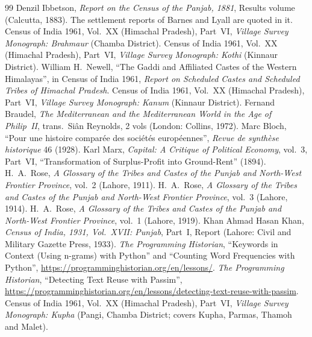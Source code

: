 \begin{thebibliography}{99}\small
{} Denzil Ibbetson, \emph{Report on the Census of the Panjab, 1881}, Results volume (Calcutta, 1883). The settlement reports of Barnes and Lyall are quoted in it.
 Census of India 1961, Vol.~XX (Himachal Pradesh), Part~VI, \emph{Village Survey Monograph: Brahmaur} (Chamba District).
 Census of India 1961, Vol.~XX (Himachal Pradesh), Part~VI, \emph{Village Survey Monograph: Kothi} (Kinnaur District).
 William H.~Newell, \enquote{The Gaddi and Affiliated Castes of the Western Himalayas}, in Census of India 1961, \emph{Report on Scheduled Castes and Scheduled Tribes of Himachal Pradesh}.
 Census of India 1961, Vol.~XX (Himachal Pradesh), Part~VI, \emph{Village Survey Monograph: Kanum} (Kinnaur District).
 Fernand Braudel, \emph{The Mediterranean and the Mediterranean World in the Age of Philip~II}, trans.\ Si\^an Reynolds, 2 vols (London: Collins, 1972).
 Marc Bloch, \enquote{Pour une histoire compar\'ee des soci\'et\'es europ\'eennes}, \emph{Revue de synth\`ese historique} 46 (1928).
 Karl Marx, \emph{Capital: A Critique of Political Economy}, vol.~3, Part~VI, \enquote{Transformation of Surplus-Profit into Ground-Rent} (1894).
 H.~A.~Rose, \emph{A Glossary of the Tribes and Castes of the Punjab and North-West Frontier Province}, vol.~2 (Lahore, 1911).
 H.~A.~Rose, \emph{A Glossary of the Tribes and Castes of the Punjab and North-West Frontier Province}, vol.~3 (Lahore, 1914).
 H.~A.~Rose, \emph{A Glossary of the Tribes and Castes of the Punjab and North-West Frontier Province}, vol.~1 (Lahore, 1919).
 Khan Ahmad Hasan Khan, \emph{Census of India, 1931, Vol.~XVII: Punjab}, Part~I, Report (Lahore: Civil and Military Gazette Press, 1933).
 \emph{The Programming Historian}, \enquote{Keywords in Context (Using n-grams) with Python} and \enquote{Counting Word Frequencies with Python}, \url{https://programminghistorian.org/en/lessons/}.
 \emph{The Programming Historian}, \enquote{Detecting Text Reuse with Passim}, \url{https://programminghistorian.org/en/lessons/detecting-text-reuse-with-passim}.
 Census of India 1961, Vol.~XX (Himachal Pradesh), Part~VI, \emph{Village Survey Monograph: Kupha} (Pangi, Chamba District; covers Kupha, Parmas, Thamoh and Malet).

\end{thebibliography}
